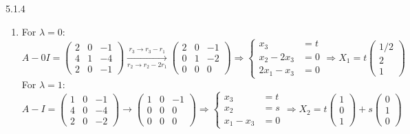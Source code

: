 \documentclass{exam}
\begin{document}
\begin{problem}{5.1.4}
\begin{parts}
\begin{enumerate}[label=\roman*.)]
        \item For $\lambda = 0$:
        \[
          A - 0I = \begin{pmatrix}
            2 & 0 & -1 \\
            4 & 1 & -4 \\
            2 & 0 & -1
          \end{pmatrix}
          \xrightarrow[r_2 \to r_2 - 2r_1]{r_3 \to r_3 - r_1}
          \begin{pmatrix}
            2 & 0 & -1 \\
            0 & 1 & -2 \\
            0 & 0 & 0
          \end{pmatrix}
          \Rightarrow \begin{cases}
            x_3 &= t \\
            x_2 - 2x_3 &= 0 \\
            2x_1 - x_3 &= 0 
          \end{cases}
          \Rightarrow X_1 = t\begin{pmatrix}
            1/2 \\ 2 \\ 1
          \end{pmatrix}
        \]
        For $\lambda = 1$:
        \[
          A - I = \begin{pmatrix}
            1 & 0 & -1 \\
            4 & 0 & -4 \\
            2 & 0 & -2 
          \end{pmatrix}
          \to 
          \begin{pmatrix}
            1 & 0 & -1 \\
            0 & 0 & 0 \\
            0 & 0 & 0
          \end{pmatrix}
          \Rightarrow \begin{cases}
            x_3 &= t \\
            x_2 &= s \\
            x_1 - x_3 &= 0
          \end{cases}
          \Rightarrow X_2 = t\begin{pmatrix}
            1 \\ 0 \\ 1
          \end{pmatrix}
          + s\begin{pmatrix}
            0 \\ 1 \\ 0
          \end{pmatrix}
        \]


\end{enumerate}
\end{parts}
\end{problem}
\end{document}
